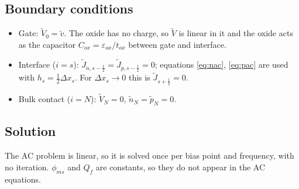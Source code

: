 \documentclass[11pt]{article}
\newcommand{\half}{\tfrac{1}{2}}
\begin{document}
\subsection{Boundary conditions}
\begin{itemize}
\item Gate: $\tilde V_0=\tilde v$. The oxide has no charge, so $\tilde V$ is linear in it and the oxide acts as
the capacitor $C_{ox}=\varepsilon_{ox}/t_{ox}$ between gate and interface.
\item Interface ($i=s$): $\tilde J_{n,s-\half}=\tilde J_{p,s-\half}=0$; equations \eqref{eq:nac},
\eqref{eq:pac} are used with $h_s=\half\Delta x_s$. For $\Delta x_s\to0$ this is $\tilde J_{s+\half}=0$.
\item Bulk contact ($i=N$): $\tilde V_N=0$, $\tilde n_N=\tilde p_N=0$.
\end{itemize}

\subsection{Solution}
The AC problem is linear, so it is solved once per bias point and frequency, with no iteration.
$\phi_{ms}$ and $Q_f$ are constants, so they do not appear in the AC equations.
\end{document}

